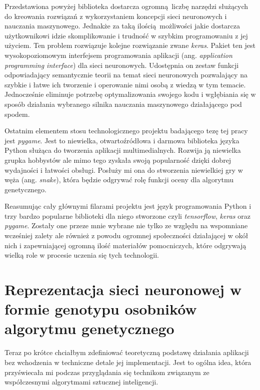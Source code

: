 \documentclass[12pt, oneside, a4paper]{report}
\begin{document}
Przedstawiona powyżej biblioteka dostarcza ogromną liczbę narzędzi służących do kreowania rozwiązań z wykorzystaniem koncepcji sieci neuronowych i nauczania maszynowego. Jednakże za taką ilością możliwości jakie dostarcza użytkownikowi idzie skomplikowanie i trudność w szybkim programowaniu z jej użyciem. Ten problem rozwiązuje kolejne rozwiązanie zwane \textit{keras}. Pakiet ten jest wysokopoziomowym interfejsem programowania aplikacji (ang. \textit{application programming interface}) dla sieci neuronowych. Udostępnia on zestaw funkcji odpowiadający semantycznie teorii na temat sieci neuronowych pozwalający na szybkie i łatwe ich tworzenie i operowanie nimi osobą z wiedzą w tym temacie. Jednocześnie eliminuje potrzebę optymalizowania swojego kodu i wgłębiania się w sposób działania wybranego silnika nauczania maszynowego działającego pod spodem.

Ostatnim elementem stosu technologicznego projektu badającego tezę tej pracy jest \textit{pygame}. Jest to niewielka, otwartoźródłowa i darmowa biblioteka języka Python służąca do tworzenia aplikacji multimedialnych. Rozwija ją niewielka grupka hobbystów ale mimo tego zyskała swoją popularność dzięki dobrej wydajności i łatwości obsługi. Posłuży mi ona do stworzenia niewielkiej gry w węża (ang. \textit{snake}), która będzie odgrywać rolę funkcji oceny dla algorytmu genetycznego.

Reasumując cały głównymi filarami projektu jest język programowania Python i trzy bardzo popularne biblioteki dla niego stworzone czyli \textit{tensorflow}, \textit{keras} oraz \textit{pygame}. Zostały one przeze mnie wybrane nie tylko ze względu na wspomniane wcześniej zalety ale również z powodu ogromnej społeczności działającej w okół nich i zapewniającej ogromną ilość materiałów pomocniczych, które odgrywają wielką role w procesie uczenia się tych technologii.

\section{Reprezentacja sieci neuronowej w formie genotypu osobników algorytmu genetycznego}

Teraz po krótce chciałbym zdefiniować teoretyczną podstawę działania aplikacji bez wchodzenia w techniczne detale jej implementacji. Jest to ogólna idea, która przyświecała mi podczas przyglądania się technikom związanym ze współczesnymi algorytmami sztucznej inteligencji.
\end{document}
